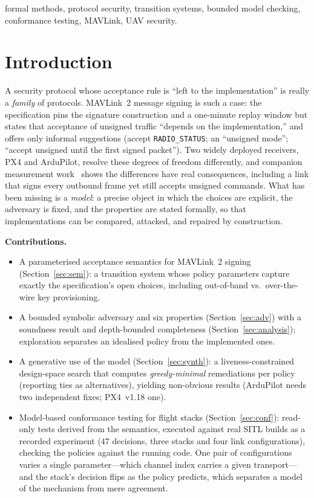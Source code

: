 \documentclass[conference]{IEEEtran}
\newcommand{\code}[1]{\texttt{#1}}
\begin{document}
\begin{IEEEkeywords}
formal methods, protocol security, transition systems, bounded model checking,
conformance testing, MAVLink, UAV security.
\end{IEEEkeywords}

\section{Introduction}
A security protocol whose acceptance rule is ``left to the implementation'' is
really a \emph{family} of protocols. MAVLink~2 message signing is such a case:
the specification pins the signature construction and a one-minute replay window
but states that acceptance of unsigned traffic ``depends on the
implementation,'' and offers only informal suggestions (accept
\code{RADIO\_STATUS}; an ``unsigned mode''; ``accept unsigned until the first
signed packet''). Two widely deployed receivers, PX4 and ArduPilot, resolve these
degrees of freedom differently, and companion measurement
work~\cite{brighouse2026signing} shows the differences have real consequences,
including a link that signs every outbound frame yet still accepts unsigned
commands. What has been missing is a \emph{model}: a precise object in which the
choices are explicit, the adversary is fixed, and the properties are stated
formally, so that implementations can be compared, attacked, and repaired by
construction.

\noindent\textbf{Contributions.}
\begin{itemize}
\item A parameterised acceptance semantics for MAVLink~2 signing
(Section~\ref{sec:sem}): a transition system whose policy parameters capture
exactly the specification's open choices, including out-of-band vs.\ over-the-wire
key provisioning.
\item A bounded symbolic adversary and six properties
(Section~\ref{sec:adv}) with a soundness result and depth-bounded completeness
(Section~\ref{sec:analysis}); exploration separates an idealised policy from the
implemented ones.
\item A generative use of the model (Section~\ref{sec:synth}): a
liveness-constrained design-space search that computes \emph{greedy-minimal}
remediations per policy (reporting ties as alternatives), yielding non-obvious
results (ArduPilot needs two independent fixes; PX4~v1.18 one).
\item Model-based conformance testing for flight stacks
(Section~\ref{sec:conf}): read-only tests derived from the semantics, executed
against real SITL builds as a recorded experiment ($47$ decisions, three stacks
and four link configurations), checking the policies against the running code.
One pair of configurations varies a single parameter---which channel index
carries a given transport---and the stack's decision flips as the policy
predicts, which separates a model of the mechanism from mere agreement.
\end{itemize}
\end{document}
